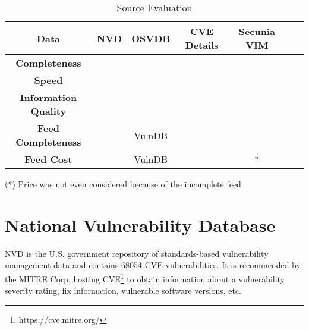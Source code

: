    
    \begin{table}
\begin{center}
    \begin{tabular}{ | c || c | c | c | c | c | c |}
    
    \hline
	 
      Data & \textbf{NVD}  &  \textbf{OSVDB} & \textbf{CVE Details} & \textbf{Secunia VIM} 
	\\ 
	\hline  
	\textbf{Completeness} & \multicolumn{1}{c|}{\cellcolor{yellow!25}\cmark} & \multicolumn{1}{c|}{\cellcolor{green!25}\cmark}
	& \multicolumn{1}{c|}{\cellcolor{yellow!25}\cmark}& \multicolumn{1}{c|}{\cellcolor{yellow!25}\cmark}
    \\ 
	\hline   
	 \textbf{Speed} & \multicolumn{1}{c|}{\cellcolor{green!25}\cmark} & \multicolumn{1}{c|}{\cellcolor{green!25}\cmark}
	& \multicolumn{1}{c|}{\cellcolor{green!25}\cmark}& \multicolumn{1}{c|}{\cellcolor{green!25}\cmark}
	  \\ 
	\hline
	 \textbf{Information Quality} & \multicolumn{1}{c|}{\cellcolor{green!25}\cmark} & \multicolumn{1}{c|}{\cellcolor{green!25}\cmark}
	& \multicolumn{1}{c|}{\cellcolor{green!25}\cmark}& \multicolumn{1}{c|}{\cellcolor{green!25}\cmark}
	  \\ 
	\hline
	 \textbf{Feed Completeness} & \multicolumn{1}{c|}{\cellcolor{green!25}\cmark} & \multicolumn{1}{c|}{\cellcolor{green!25}VulnDB}
	& \multicolumn{1}{c|}{\cellcolor{red!25}\xmark}& \multicolumn{1}{c|}{\cellcolor{red!25}\xmark}
	 \\
	 \hline
	 
	 \textbf{Feed Cost} & \multicolumn{1}{c|}{\cellcolor{green!25}\cmark} & \multicolumn{1}{c|}{\cellcolor{red!25}VulnDB}
	& \multicolumn{1}{c|}{\cellcolor{green!25}\cmark}& \multicolumn{1}{c|}{\cellcolor{white!25}*}
	 \\
	 \hline
     
\end{tabular}
    \caption{Source Evaluation}
    \label{table:source_evaluation}
    \footnotesize{(*) Price was not even considered because of the incomplete feed}
   \end{center}
    \end{table}


\section{National Vulnerability Database}
NVD is the U.S. government repository of standards-based vulnerability management data and contains 68054 CVE vulnerabilities. It is recommended by the MITRE Corp. hosting CVE\footnote{https://cve.mitre.org/} to obtain information about a vulnerability severity rating, fix information, vulnerable software versions, etc. 
 
